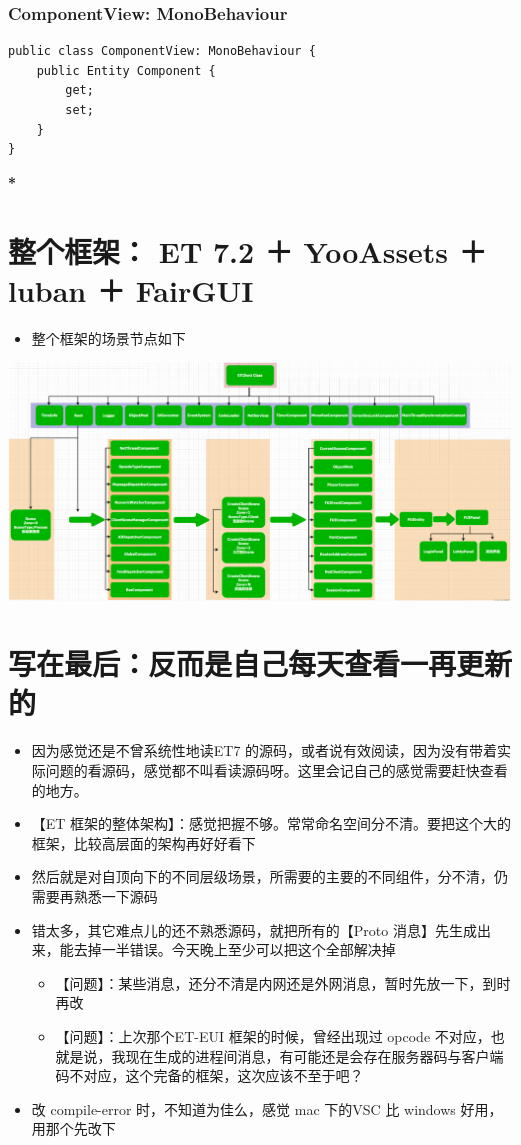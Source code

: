 \documentclass[9pt, b5paper]{article}
\begin{document}
\subsubsection{ComponentView: MonoBehaviour}
\label{sec:orgbfd9504}
\begin{verbatim}
public class ComponentView: MonoBehaviour {
    public Entity Component {
        get;
        set;
    }
}
\end{verbatim}
\textbf{*}

\section{整个框架： ET 7.2 ＋ YooAssets ＋ luban ＋ FairGUI}
\label{sec:org4bb3278}
\begin{itemize}
\item 整个框架的场景节点如下
\end{itemize}

\begin{center}
\includegraphics[width=.9\linewidth]{./pic/ET_20230512_143227.png}
\end{center}

\section{写在最后：反而是自己每天查看一再更新的}
\label{sec:org761824b}
\begin{itemize}
\item 因为感觉还是不曾系统性地读ET7 的源码，或者说有效阅读，因为没有带着实际问题的看源码，感觉都不叫看读源码呀。这里会记自己的感觉需要赶快查看的地方。
\item 【ET 框架的整体架构】：感觉把握不够。常常命名空间分不清。要把这个大的框架，比较高层面的架构再好好看下
\item 然后就是对自顶向下的不同层级场景，所需要的主要的不同组件，分不清，仍需要再熟悉一下源码
\item 错太多，其它难点儿的还不熟悉源码，就把所有的【Proto 消息】先生成出来，能去掉一半错误。今天晚上至少可以把这个全部解决掉
\begin{itemize}
\item 【问题】：某些消息，还分不清是内网还是外网消息，暂时先放一下，到时再改
\item 【问题】：上次那个ET-EUI 框架的时候，曾经出现过 opcode 不对应，也就是说，我现在生成的进程间消息，有可能还是会存在服务器码与客户端码不对应，这个完备的框架，这次应该不至于吧？
\end{itemize}
\item 改 compile-error 时，不知道为佳么，感觉 mac 下的VSC 比 windows 好用，用那个先改下
\end{itemize}
\end{document}
